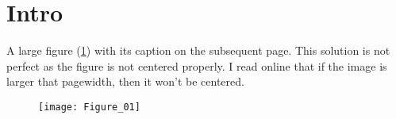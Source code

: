 \documentclass{article}
\begin{document}
\section{Intro}

A large figure (\ref{fig:test}) with its caption on the subsequent page. This
solution is not perfect as the figure is not centered properly. I read online
that if the image is larger that pagewidth, then it won't be centered.

\begin{figure}[!hb]
	\begin{center}
	\captionsetup{labelformat=empty}
	\noindent\texttt{[image: Figure\_01]}
	\caption{} %
	\end{center}
\end{figure}

\begin{figure}[!t]
	\captionsetup{labelformat=adja-page}
	\ContinuedFloat
	\caption{\protect\lipsum[1]}
	\label{fig:test}
\end{figure}

\lipsum[1-2]
\end{document}
